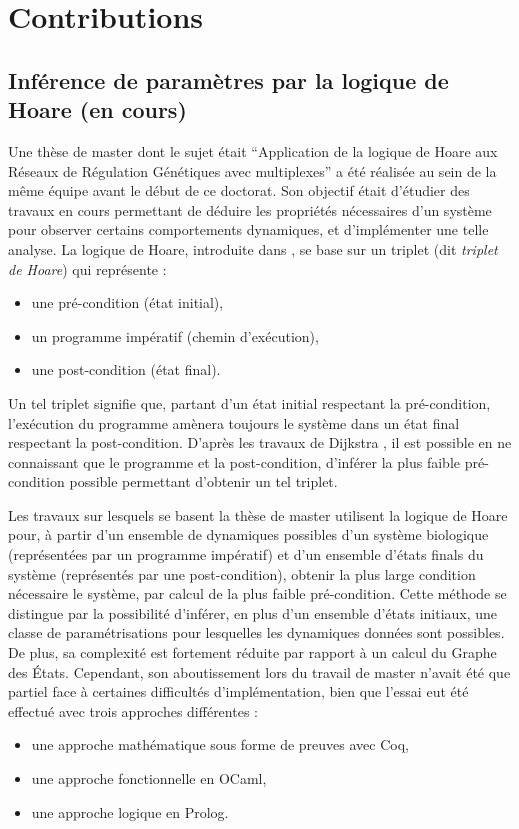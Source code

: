 \chapter{Contributions}

\section{Inférence de paramètres par la logique de Hoare \normalsize(en cours)}

Une thèse de master \cite{Folschette2011} dont le sujet était “Application de la logique de Hoare aux Réseaux de Régulation Génétiques avec multiplexes” a été réalisée au sein de la même équipe avant le début de ce doctorat.
Son objectif était d'étudier des travaux en cours permettant de déduire les propriétés nécessaires d'un système pour observer certains comportements dynamiques, et d'implémenter une telle analyse.
La logique de Hoare, introduite dans \cite{hoare-69}, se base sur un triplet (dit \emph{triplet de Hoare}) qui représente :
\begin{itemize}
  \item une pré-condition (état initial),
  \item un programme impératif (chemin d'exécution),
  \item une post-condition (état final).
\end{itemize}
Un tel triplet signifie que, partant d'un état initial respectant la pré-condition, l'exécution du programme amènera toujours le système dans un état final respectant la post-condition.
D'après les travaux de Dijkstra \cite{dijkstra-75}, il est possible en ne connaissant que le programme et la post-condition,
d'inférer la plus faible pré-condition possible permettant d'obtenir un tel triplet.

Les travaux sur lesquels se basent la thèse de master utilisent la logique de Hoare pour,
à partir d'un ensemble de dynamiques possibles d'un système biologique (représentées par un programme impératif)
et d'un ensemble d'états finals du système (représentés par une post-condition),
obtenir la plus large condition nécessaire le système, par calcul de la plus faible pré-condition.
Cette méthode se distingue par la possibilité d'inférer, en plus d'un ensemble d'états initiaux, une classe de paramétrisations pour lesquelles les dynamiques données sont possibles.
De plus, sa complexité est fortement réduite par rapport à un calcul du Graphe des États.
Cependant, son aboutissement lors du travail de master n'avait été que partiel face à certaines difficultés d'implémentation, bien que l'essai eut été effectué avec trois approches différentes :
\begin{itemize}
  \item une approche mathématique sous forme de preuves avec Coq,
  \item une approche fonctionnelle en OCaml,
  \item une approche logique en Prolog.
\end{itemize}

